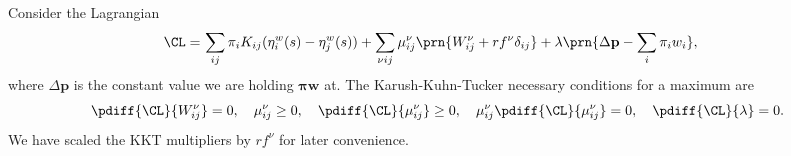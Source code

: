 \documentclass[12pt]{article}
\newcommand{\prm}{p}
\newcommand{\pr}{\mathbf{\prm}}
\newcommand{\eqm}{\pi}
\newcommand{\eq}{\boldsymbol{\eqm}}
\newcommand{\etwm}{\eta^w}
\newcommand{\wm}{w}
\newcommand{\w}{\mathbf{\wm}}
\newcommand{\Wm}{W}
\newcommand{\encm}{K}
\begin{document}
Consider the Lagrangian
%
\begin{equation}\label{eq:finitelagrangian}
\begin{aligned}
  \CL =&\, \sum_{ij} \eqm_i \encm_{ij} (\etwm_i(s) - \etwm_j(s))
        +\sum_{\nu i j} \mu^\nu_{ij} \prn{ \Wm^\nu_{ij} + r f^\nu \delta_{ij} }
        + \lambda \prn{ \Delta\pr - \sum_i \eqm_i \wm_i },
\end{aligned}
\end{equation}
%
where \(\Delta\pr\) is the constant value we are holding \(\eq\w\) at.
The Karush-Kuhn-Tucker necessary conditions for a maximum are
%
\begin{equation}\label{eq:KTfinite}
  \pdiff{\CL}{\Wm^\nu_{ij}} = 0, \quad
  \mu^\nu_{ij} \geq 0, \quad
  \pdiff{\CL}{\mu^\nu_{ij}} \geq 0, \quad
  \mu^\nu_{ij}\pdiff{\CL}{\mu^\nu_{ij}} = 0, \quad
  \pdiff{\CL}{\lambda} = 0.
\end{equation}
%
We have scaled the KKT multipliers by \(r f^\nu\) for later convenience.
\end{document}
